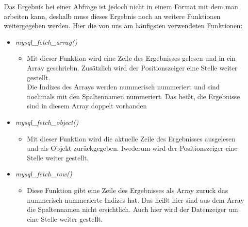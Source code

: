 Das Ergebnis bei einer Abfrage ist jedoch nicht in einem Format mit dem man arbeiten kann, deshalb muss dieses Ergebnis noch an weitere Funktionen weitergegeben werden. Hier die von uns am häufigsten verwendeten Funktionen:
\begin{itemize}
	\item \textit{mysql\_fetch\_array()}
	\begin{itemize}
		\item Mit dieser Funktion wird eine Zeile des Ergebnisses gelesen und in ein Array geschriebn. Zusätzlich wird der Positionszeiger eine Stelle weiter gestellt.\\
		Die Indizes des Arrays werden nummerisch nummeriert und sind nochmals mit den Spaltennamen nummeriert. Das heißt, die Ergebnisse sind in diesem Array doppelt vorhanden 
	\end{itemize}
	\item \textit{mysql\_fetch\_object()}
		\begin{itemize}
			\item Mit dieser Funktion wird die aktuelle Zeile des Ergebnisses ausgelesen und als Objekt zurückgegeben. Iwederum wird der Positionszeiger eine Stelle weiter gestellt.
		\end{itemize}
	\item \textit{mysql\_fetch\_row()}
		\begin{itemize}
			\item Diese Funktion gibt eine Zeile des Ergebnisses als Array zurück das nummerisch nummerierte Indizes hat. Das heißt hier sind aus dem Array die Spaltennamen nicht ersichtlich. Auch hier wird der Datenzeiger um eine Stelle weiter gestellt.
		\end{itemize}
\end{itemize}